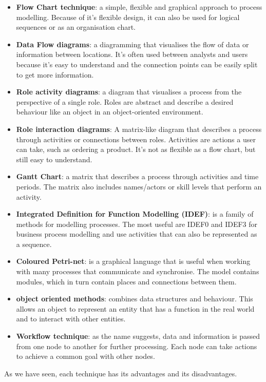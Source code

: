 \begin{itemize}
    
    \item \textbf{Flow Chart technique}: a simple, flexible and graphical approach to process modelling. Because of it's flexible design, it can also be used for logical sequences or as an organisation chart. 
    
    \item \textbf{Data Flow diagrams}: a diagramming that visualises the flow of data or information between locations. It's often used between analysts and users because it's easy to understand and the connection points can be easily split to get more information.
    
    \item \textbf{Role activity diagrams}: a diagram that visualises a process from the perspective of a single role. Roles are abstract and describe a desired behaviour like an object in an object-oriented environment.
    
    \item \textbf{Role interaction diagrams}: A matrix-like diagram that describes a process through activities or connections between roles. Activities are actions a user can take, such as ordering a product. It's not as flexible as a flow chart, but still easy to understand.
    
    \item \textbf{Gantt Chart}: a matrix that describes a process through activities and time periods. The matrix also includes names/actors or skill levels that perform an activity.
    
    \item \textbf{Integrated Definition for Function Modelling (IDEF)}: is a family of methods for modelling processes. The most useful are IDEF0 and IDEF3 for business process modelling and use activities that can also be represented as a sequence.
    
    \item \textbf{Coloured Petri-net}: is a graphical language that is useful when working with many processes that communicate and synchronise. The model contains modules, which in turn contain places and connections between them.
    
    \item \textbf{object oriented methods}: combines data structures and behaviour. This allows an object to represent an entity that has a function in the real world and to interact with other entities.
    
    \item \textbf{Workflow technique}: as the name suggests, data and information is passed from one node to another for further processing. Each node can take actions to achieve a common goal with other nodes. 
    
\end{itemize}

As we have seen, each technique has its advantages and its disadvantages.
